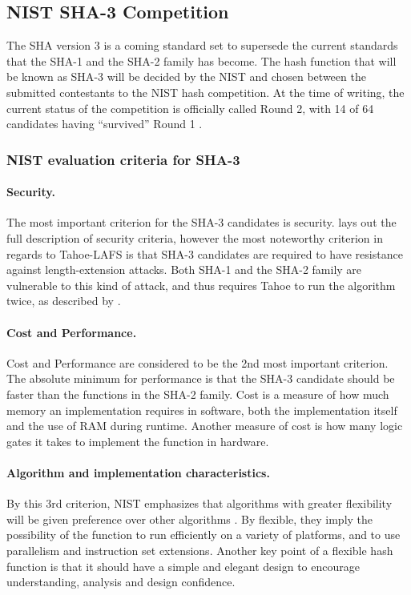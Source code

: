 \documentclass[english,12pt,a4paper]{book}
\begin{document}
\subsection{NIST SHA-3 Competition}
The \ac{SHA} version 3 is a coming standard set to supersede the current
standards that the \ac{SHA}-1 and the \ac{SHA}-2 family has become. The hash
function that will be known as \ac{SHA}-3 will be decided by the \ac{NIST} and
chosen between the submitted contestants to the \ac{NIST} hash competition.
At the time of writing, the current status of the competition is officially
called Round 2, with 14 of 64 candidates having ``survived'' Round 1
\cite{s_fedreg}.

\subsubsection{NIST evaluation criteria for SHA-3}

\label{sec:lengthextension}
\paragraph{Security.} The most important criterion for the SHA-3
candidates\cite{s_nistround2} is security. \citet{s_fedreg} lays out the full
description of security criteria, however the most noteworthy criterion
in regards to Tahoe-\ac{LAFS} is that \ac{SHA}-3 candidates are required to have
resistance against length-extension attacks. Both \ac{SHA}-1 and the \ac{SHA}-2
family are vulnerable to this kind of attack, and thus requires
Tahoe to run the algorithm twice, as described by \citet{schneier}.

\paragraph{Cost and Performance.} Cost and Performance are considered to be the
2nd most important criterion. The absolute minimum for performance is that the
SHA-3 candidate should be faster than the functions in the \ac{SHA}-2 family.
Cost is a measure of how much memory an implementation requires in software,
both the implementation itself and the use of \ac{RAM} during runtime. Another
measure of cost is how many logic gates it takes to implement the function in
hardware.

\paragraph{Algorithm and implementation characteristics.} By this 3rd criterion,
\ac{NIST} emphasizes that algorithms with greater flexibility will be given
preference over other algorithms \cite{s_nistround2}. By flexible, they imply
the possibility of the function to run efficiently on a variety of platforms,
and to use parallelism and instruction set extensions. Another key point of a
flexible hash function is that it should have a simple and elegant design to
encourage understanding, analysis and design confidence.
\end{document}
